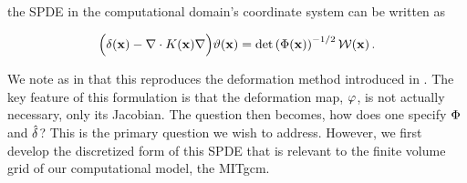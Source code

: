 the SPDE in the computational domain's coordinate system can be written as
\begin{linenomath}\begin{equation}
    \Big(\delta(\mathbf{x})- \nabla\cdot K(\mathbf{x})\nabla\Big)\vartheta(\mathbf{x}) =
    \text{det}\left(\Phi(\mathbf{x})\right)^{-1/2}\mathcal{W}(\mathbf{x}) \, .
    \label{eq:spde_general}
\end{equation}\end{linenomath}
We note as in \citet{RSSB:RSSB777} that this reproduces the deformation method
introduced in \citet{sampson_nonparametric_1992}.
The key feature of this formulation is that the deformation map, $\varphi$, is
not actually necessary, only its Jacobian.
The question then becomes, how does one specify $\Phi$ and $\hat{\delta}$?
This is the primary question we wish to address.
However, we first develop the discretized form of this SPDE
that is relevant to the finite volume grid of our computational model, the
MITgcm.
